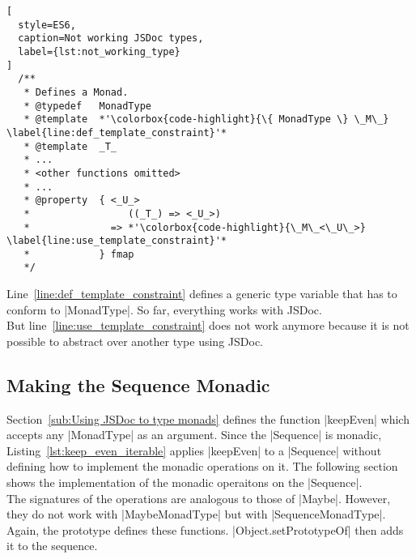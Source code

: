 \begin{lstlisting}[
  style=ES6,
  caption=Not working JSDoc types,
  label={lst:not_working_type}
]
  /**
   * Defines a Monad.
   * @typedef   MonadType
   * @template  *'\colorbox{code-highlight}{\{ MonadType \} \_M\_} \label{line:def_template_constraint}'*
   * @template  _T_
   * ...
   * <other functions omitted>
   * ...
   * @property  { <_U_>
   *                 ((_T_) => <_U_>)
   *              => *'\colorbox{code-highlight}{\_M\_<\_U\_>} \label{line:use_template_constraint}'*
   *            } fmap
   */
\end{lstlisting}

Line~\ref{line:def_template_constraint} defines a generic type variable that
has to conform to |MonadType|. So far, everything works with JSDoc.\\ But
line~\ref{line:use_template_constraint} does not work anymore because it is not
possible to abstract over another type using JSDoc.\\

\subsection{Making the Sequence Monadic} %
\label{sub:Making the Sequence Monadic}
Section~\ref{sub:Using JSDoc to type monads} defines the function |keepEven|
which accepts any |MonadType| as an argument. Since the |Sequence| is monadic,
Listing~\ref{lst:keep_even_iterable} applies |keepEven| to a |Sequence| without
defining how to implement the monadic operations on it. The following section
shows the implementation of the monadic operaitons on the |Sequence|.\\
The signatures of the operations are analogous to those of |Maybe|. However,
they do not work with |MaybeMonadType| but with |SequenceMonadType|. Again, the
prototype defines these functions. |Object.setPrototypeOf| then adds it to the
sequence.

